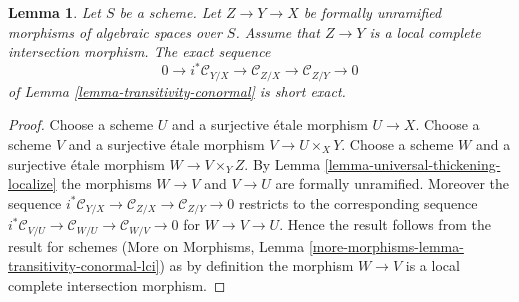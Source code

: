 \documentclass[10pt,a4paper]{amsart}
\theoremstyle{plain}
\newtheorem{lemma}[subsection]{Lemma}
\theoremstyle{definition}
\theoremstyle{remark}
\numberwithin{equation}{subsection}
\begin{document}
\begin{lemma}
\label{lemma-transitivity-conormal-lci}
Let $S$ be a scheme. Let $Z \to Y \to X$ be formally unramified morphisms
of algebraic spaces over $S$. Assume that $Z \to Y$ is a local complete
intersection morphism. The exact sequence
$$
0 \to i^*\mathcal{C}_{Y/X} \to
\mathcal{C}_{Z/X} \to
\mathcal{C}_{Z/Y} \to 0
$$
of
Lemma \ref{lemma-transitivity-conormal}
is short exact.
\end{lemma}

\begin{proof}
Choose a scheme $U$ and a surjective \'etale morphism $U \to X$.
Choose a scheme $V$ and a surjective \'etale morphism $V \to U \times_X Y$.
Choose a scheme $W$ and a surjective \'etale morphism $W \to V \times_Y Z$.
By
Lemma \ref{lemma-universal-thickening-localize}
the morphisms $W \to V$ and $V \to U$ are formally unramified.
Moreover the sequence
$i^*\mathcal{C}_{Y/X} \to \mathcal{C}_{Z/X} \to \mathcal{C}_{Z/Y} \to 0$
restricts to the corresponding sequence
$i^*\mathcal{C}_{V/U} \to \mathcal{C}_{W/U} \to \mathcal{C}_{W/V} \to 0$
for $W \to V \to U$. Hence the result follows from the result for schemes
(More on Morphisms, Lemma \ref{more-morphisms-lemma-transitivity-conormal-lci})
as by definition the morphism $W \to V$ is a local complete intersection
morphism.
\end{proof}
\end{document}
